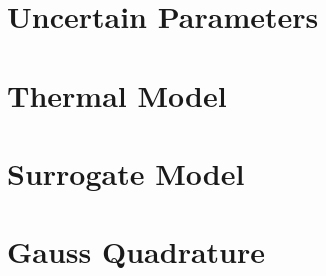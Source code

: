 \renewcommand{\thesection}{S\arabic{section}}
\renewcommand{\thetable}{S\arabic{table}}
\renewcommand{\thefigure}{S\arabic{figure}}
\setcounter{table}{0}
\setcounter{figure}{0}



\section{Uncertain Parameters} 


\section{Thermal Model} 


\section{Surrogate Model} 


\section{Gauss Quadrature} 

